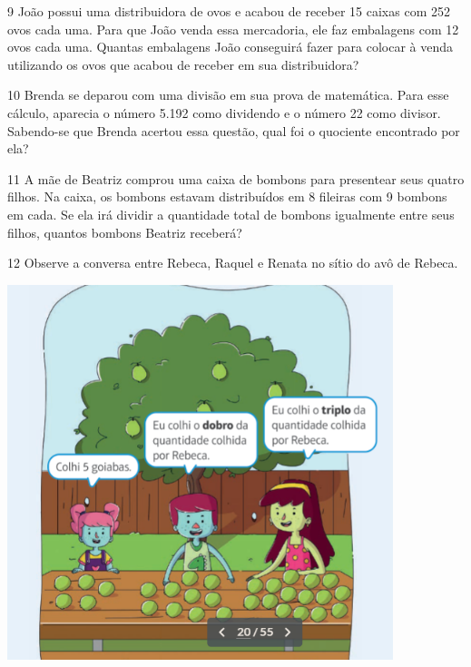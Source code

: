 \num{9} João possui uma distribuidora de ovos e acabou de receber 15 caixas com 252
ovos cada uma. Para que João venda essa mercadoria, ele faz embalagens
com 12 ovos cada uma. Quantas embalagens João conseguirá fazer para
colocar à venda utilizando os ovos que acabou de receber em sua distribuidora?




\num{10} Brenda se deparou com uma divisão em sua prova de matemática. Para esse
cálculo, aparecia o número 5.192 como dividendo e o número 22 como divisor. Sabendo-se que
Brenda acertou essa questão, qual foi o quociente encontrado por ela?



\num{11} A mãe de Beatriz comprou uma caixa de bombons para presentear seus
quatro filhos. Na caixa, os bombons estavam distribuídos em 8 fileiras
com 9 bombons em cada. Se ela irá dividir a quantidade total de bombons
igualmente entre seus filhos, quantos bombons Beatriz receberá?





\num{12} Observe a conversa entre Rebeca, Raquel e Renata no sítio do avô de Rebeca.

\includegraphics[width=4.42538in,height=4.30871in]{media/image24.png}

